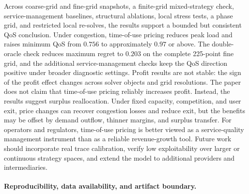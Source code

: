 \documentclass[11pt,a4paper]{article}
\begin{document}
Across coarse-grid and fine-grid snapshots, a finite-grid mixed-strategy check, service-management baselines, structural ablations, local stress tests, a phase grid, and restricted local re-solves, the results support a bounded but consistent QoS conclusion. Under congestion, time-of-use pricing reduces peak load and raises minimum QoS from $0.756$ to approximately $0.97$ or above. The double-oracle check reduces maximum regret to $0.203$ on the complete 225-point fine grid, and the additional service-management checks keep the QoS direction positive under broader diagnostic settings. Profit results are not stable: the sign of the profit effect changes across solver objects and grid resolutions. The paper does not claim that time-of-use pricing reliably increases profit. Instead, the results suggest surplus reallocation. Under fixed capacity, competition, and user exit, price changes can recover congestion losses and reduce exit, but the benefits may be offset by demand outflow, thinner margins, and surplus transfer. For operators and regulators, time-of-use pricing is better viewed as a service-quality management instrument than as a reliable revenue-growth tool. Future work should incorporate real trace calibration, verify low exploitability over larger or continuous strategy spaces, and extend the model to additional providers and intermediaries.

\paragraph{Reproducibility, data availability, and artifact boundary.}
\end{document}
